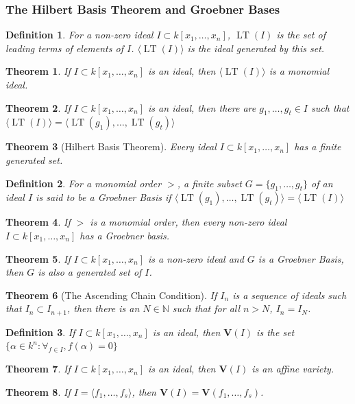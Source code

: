 \documentclass[oneside]{book}
\theoremstyle{mystyle}
\newtheorem{theorem}{Theorem}[section]
\newtheorem{definition}{Definition}[section]
\DeclareMathOperator{\LT}{LT}
\begin{document}
\subsubsection{The Hilbert Basis Theorem and Groebner Bases}
\begin{definition}
For a non-zero ideal $I\subset k[x_1,\hdots ,x_n]$, $\LT(I)$ is the set of leading terms of elements of $I$. $\langle \LT(I)\rangle$ is the ideal generated by this set.
\end{definition}
\begin{theorem}
If $I\subset k[x_1,\hdots ,x_n]$ is an ideal, then $\langle \LT(I)\rangle$ is a monomial ideal.
\end{theorem}
\begin{theorem}
If $I\subset k[x_1,\hdots ,x_n]$ is an ideal, then there are $g_1,\hdots, g_t\in I$ such that $\langle \LT(I)\rangle = \langle \LT(g_1),\hdots, \LT(g_t)\rangle$
\end{theorem}
\begin{theorem}[Hilbert Basis Theorem]
Every ideal $I\subset k[x_1,\hdots ,x_n]$ has a finite generated set.
\end{theorem}
\begin{definition}
For a monomial order $>$, a finite subset $G=\{g_1,\hdots, g_t\}$ of an ideal $I$ is said to be a Groebner Basis if $\langle \LT(g_1),\hdots, \LT(g_t)\rangle = \langle \LT(I)\rangle$
\end{definition}
\begin{theorem}
If $>$ is a monomial order, then every non-zero ideal $I\subset k[x_1,\hdots ,x_n]$ has a Groebner basis.
\end{theorem}
\begin{theorem}
If $I\subset k[x_1,\hdots ,x_n]$ is a non-zero ideal and $G$ is a Groebner Basis, then $G$ is also a generated set of $I$.
\end{theorem}
\begin{theorem}[The Ascending Chain Condition]
If $I_n$ is a sequence of ideals such that $I_{n}\subset I_{n+1}$, then there is an $N\in \mathbb{N}$ such that for all $n>N$, $I_n = I_N$.
\end{theorem}
\begin{definition}
If $I\subset k[x_1,\hdots ,x_n]$ is an ideal, then $\textbf{V}(I)$ is the set $\{\alpha \in k^n: \forall_{f\in I},f(\alpha) = 0\}$
\end{definition}
\begin{theorem}
If $I\subset k[x_1,\hdots ,x_n]$ is an ideal, then $\textbf{V}(I)$ is an affine variety.
\end{theorem}
\begin{theorem}
If $I = \langle f_1,\hdots, f_s\rangle$, then $\textbf{V}(I) = \mathbf{V}(f_1,\hdots, f_s)$.
\end{theorem}
\end{document}
